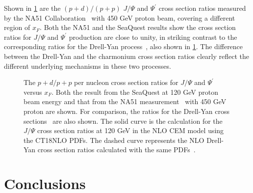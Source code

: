 \documentclass[reprint,aps,unsortedaddress,superscriptaddress,prd,floatfix,showpacs,linenumbers]{revtex4-2}
\begin{document}
Shown in \cref{fig:pd/pp_csr} are the $(p+d)/(p+p)$ $J/\Psi$
and $\Psi^\prime$ cross section
ratios measured by the NA51 Collaboration~\cite{abreu1998} with 450 GeV proton
beam, covering a different region of $x_F$. Both the NA51 and the SeaQuest
results show the cross section ratios for $J/\Psi$ and $\Psi^\prime$
production are close to unity, in striking contrast to
the corresponding ratios for the Drell-Yan process~\cite{dove2023}, also
shown in \cref{fig:pd/pp_csr}. The difference between the Drell-Yan and the charmonium
cross section ratios clearly reflect the different underlying mechanisms in
these two processes.
\begin{figure}
	\caption{The $p+d/p+p$ per nucleon cross section ratios for $J/\Psi$ and
		$\Psi^\prime$ versus $x_F$. Both the result from the SeaQuest at 120 GeV proton
		beam energy and that from the NA51 measurement~\cite{abreu1998} with 450
		GeV proton are shown.
		For comparison, the ratios for the Drell-Yan cross sections~\cite{dove2023} are
		also shown. The solid curve is the calculation for the $J/\Psi$ cross section
		ratios at 120 GeV in the NLO CEM model using the CT18NLO PDFs. The dashed
		curve represents the NLO Drell-Yan cross section ratios calculated with the
		same PDFs~\cite{dove2023}.}
	\label{fig:pd/pp_csr}
\end{figure}

\section{Conclusions}
\label{sec:Conclusions}

\begin{acknowledgments}
\end{acknowledgments}

\nocite{*}

\end{document}
